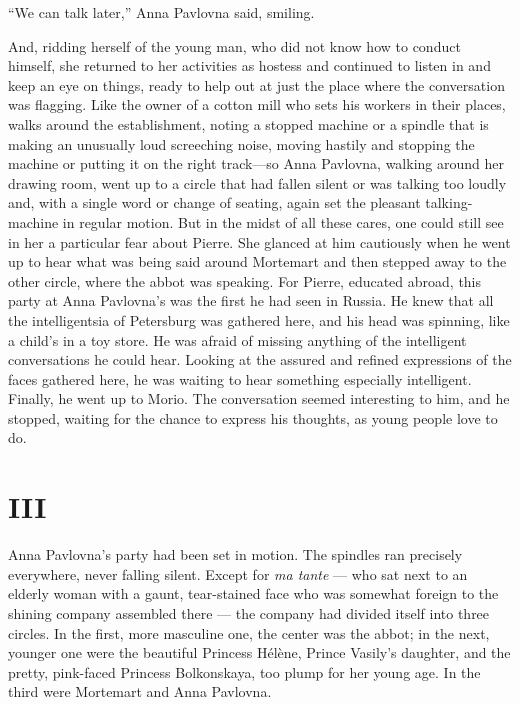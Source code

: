 ``We can talk later,'' Anna Pavlovna said, smiling. %

And, ridding herself of the young man, who did not know how to conduct himself, she returned to her activities as hostess and continued to listen in and keep an eye on things, ready to help out at just the place where the conversation was flagging. Like the owner of a cotton mill who sets his workers in their places, walks around the establishment, noting a stopped machine or a spindle that is making an unusually loud screeching noise, moving hastily and stopping the machine or putting it on the right track---so Anna Pavlovna, walking around her drawing room, went up to a circle that had fallen silent or was talking too loudly and, with a single word or change of seating, again set the pleasant talking-machine in regular motion. But in the midst of all these cares, one could still see in her a particular fear about Pierre. She glanced at him cautiously when he went up to hear what was being said around Mortemart and then stepped away to the other circle, where the abbot was speaking. For Pierre, educated abroad, this party at Anna Pavlovna's was the first he had seen in Russia. He knew that all the intelligentsia of Petersburg was gathered here, and his head was spinning, like a child's in a toy store. He was afraid of missing anything of the intelligent conversations he could hear. Looking at the assured and refined expressions of the faces gathered here, he was waiting to hear something especially intelligent. Finally, he went up to Morio. The conversation seemed interesting to him, and he stopped, waiting for the chance to express his thoughts, as young people love to do.

\section*{III} %

Anna Pavlovna's party had been set in motion. The spindles ran precisely everywhere, never falling silent. Except for \textit{ma tante} --- who sat next to an elderly woman with a gaunt, tear-stained face who was somewhat foreign to the shining company assembled there --- the company had divided itself into three circles. In the first, more masculine one, the center was the abbot; in the next, younger one were the beautiful Princess H\'el\`ene, Prince Vasily's daughter, and the pretty, pink-faced Princess Bolkonskaya, too plump for her young age. In the third were Mortemart and Anna Pavlovna.

